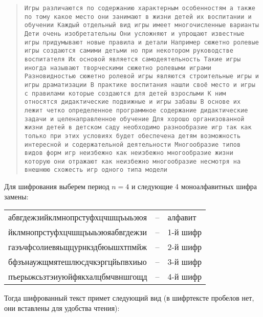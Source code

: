 \begin{quote}
    \noindent \texttt{Игры различаются по содержанию характерным особенностям а также по тому какое место они занимают в жизни детей их воспитании и обучении Каждый отдельный вид игры имеет многочисленные варианты Дети очень изобретательны Они усложняют и упрощают известные игры придумывают новые правила и детали Например сюжетно ролевые игры создаются самими детьми но при некотором руководстве воспитателя Их основой является самодеятельность Такие игры иногда называют творческими сюжетно ролевыми играми Разновидностью сюжетно ролевой игры являются строительные игры и игры драматизации В практике воспитания нашли своё место и игры с правилами которые создаются для детей взрослыми К ним относятся дидактические подвижные и игры забавы В основе их лежит четко определенное программное содержание дидактические задачи и целенаправленное обучение Для хорошо организованной жизни детей в детском саду необходимо разнообразие игр так как только при этих условиях будет обеспечена детям возможность интересной и содержательной деятельности Многообразие типов видов форм игр неизбежно как неизбежно многообразие жизни которую они отражают как неизбежно многообразие несмотря на внешнюю схожесть игр одного типа модели}
\end{quote}

Для шифрования выберем период $n=4$ и следующие 4 моноалфавитных шифра замены:

\begin{center} \begin{tabular}{|lcl|}
    \hline
    абвгдежзийклмнопрстуфхцчшщъыьэюя & -- & алфавит \\
    йклмнопрстуфхцчшщъыьэюяабвгдежзи & -- & 1-й шифр \\
    гаэъчфсолиевяьщцурнкздбюышхтпмйж & -- & 2-й шифр \\
    бфзънаужщмятешлюсдчкэргцйьпвхиыо & -- & 3-й шифр \\
    пъерыжсьзтэиуюйфякхалцбмчвншгощд & -- & 4-й шифр \\
    \hline
\end{tabular} \end{center}

Тогда шифрованный текст примет следующий вид (в шифртексте пробелов нет, они вставлены для удобства чтения):

